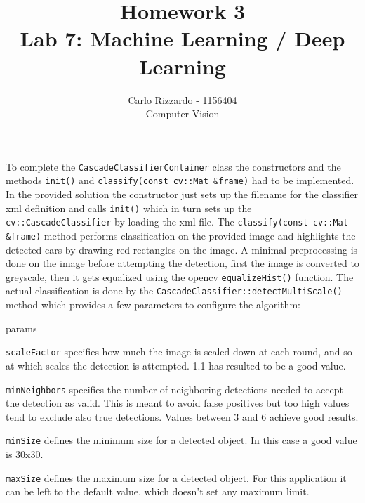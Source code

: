 \documentclass[12pt]{article}
\begin{document}
 
 
 
\title{Homework 3\\
Lab 7:  Machine Learning / Deep Learning}%
\author{Carlo Rizzardo - 1156404\\ %
Computer Vision} %
 
\maketitle


To complete the \texttt{CascadeClassifierContainer} class the constructors and the methods \texttt{init()} and \texttt{classify(const cv::Mat \&frame)} had to be implemented.
In the provided solution the constructor just sets up the filename for the classifier xml definition and calls \texttt{init()} which in turn sets up the \texttt{cv::CascadeClassifier} by loading the xml file.
The \texttt{classify(const cv::Mat \&frame)} method performs classification on the provided image and highlights the detected cars by drawing red rectangles on the image.
A minimal preprocessing is done on the image before attempting the detection, first the image is converted to greyscale, then it gets equalized using the opencv \texttt{equalizeHist()} function.
The actual classification is done by the \texttt{CascadeClassifier::detectMultiScale()} method which provides a few parameters to configure the algorithm:
\begin{labeling}{params}
\item[\texttt{scaleFactor}] specifies how much the image is scaled down at each round, and so at which scales the detection is attempted. 1.1 has resulted to be a good value.
\item[\texttt{minNeighbors}] specifies the number of neighboring detections needed to accept the detection as valid. This is meant to avoid false positives but too high values tend to exclude also true detections. Values between 3 and 6 achieve good results.
\item[\texttt{minSize}] defines the minimum size for a detected object. In this case a good value is 30x30.
\item[\texttt{maxSize}] defines the maximum size for a detected object. For this application it can be left to the default value, which doesn't set any maximum limit.
\end{labeling}
\end{document}
